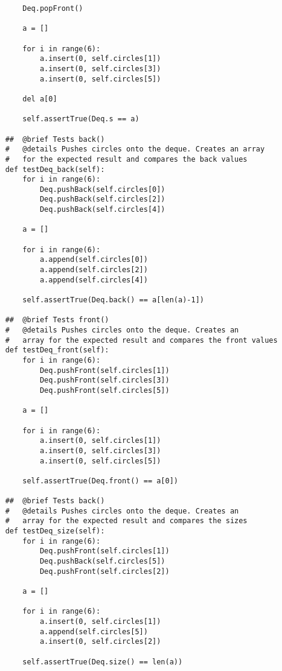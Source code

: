 \documentclass{article}
\begin{document}
\begin{lstlisting}
        Deq.popFront()

        a = []

        for i in range(6):
            a.insert(0, self.circles[1])
            a.insert(0, self.circles[3])
            a.insert(0, self.circles[5])

        del a[0]

        self.assertTrue(Deq.s == a)
        
    ##  @brief Tests back()
    #   @details Pushes circles onto the deque. Creates an array 
    #   for the expected result and compares the back values
    def testDeq_back(self):
        for i in range(6):
            Deq.pushBack(self.circles[0])
            Deq.pushBack(self.circles[2])
            Deq.pushBack(self.circles[4])

        a = []

        for i in range(6):
            a.append(self.circles[0])
            a.append(self.circles[2])
            a.append(self.circles[4])

        self.assertTrue(Deq.back() == a[len(a)-1])
        
    ##  @brief Tests front()
    #   @details Pushes circles onto the deque. Creates an 
    #   array for the expected result and compares the front values
    def testDeq_front(self):
        for i in range(6):
            Deq.pushFront(self.circles[1])
            Deq.pushFront(self.circles[3])
            Deq.pushFront(self.circles[5])

        a = []

        for i in range(6):
            a.insert(0, self.circles[1])
            a.insert(0, self.circles[3])
            a.insert(0, self.circles[5])

        self.assertTrue(Deq.front() == a[0])
       
    ##  @brief Tests back()
    #   @details Pushes circles onto the deque. Creates an  
    #   array for the expected result and compares the sizes
    def testDeq_size(self):
        for i in range(6):
            Deq.pushFront(self.circles[1])
            Deq.pushBack(self.circles[5])
            Deq.pushFront(self.circles[2])

        a = []

        for i in range(6):
            a.insert(0, self.circles[1])
            a.append(self.circles[5])
            a.insert(0, self.circles[2])

        self.assertTrue(Deq.size() == len(a))
      

\end{lstlisting}
\end{document}
